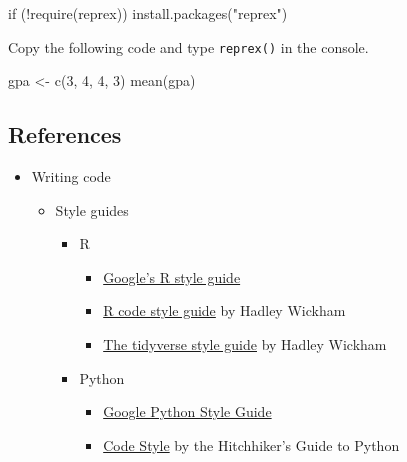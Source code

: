 \documentclass[
  letterpaper,
  DIV=11,
  numbers=noendperiod]{scrreprt}
\newenvironment{Shaded}{\begin{snugshade}}{\end{snugshade}}
\newcommand{\ControlFlowTok}[1]{\textcolor[rgb]{0.00,0.23,0.31}{#1}}
\newcommand{\DecValTok}[1]{\textcolor[rgb]{0.68,0.00,0.00}{#1}}
\newcommand{\FunctionTok}[1]{\textcolor[rgb]{0.28,0.35,0.67}{#1}}
\newcommand{\NormalTok}[1]{\textcolor[rgb]{0.00,0.23,0.31}{#1}}
\newcommand{\OtherTok}[1]{\textcolor[rgb]{0.00,0.23,0.31}{#1}}
\newcommand{\SpecialCharTok}[1]{\textcolor[rgb]{0.37,0.37,0.37}{#1}}
\newcommand{\StringTok}[1]{\textcolor[rgb]{0.13,0.47,0.30}{#1}}
\providecommand{\tightlist}{%
  \setlength{\itemsep}{0pt}\setlength{\parskip}{0pt}}\usepackage{longtable,booktabs,array}
\begin{document}
\begin{Shaded}
\begin{Highlighting}[]
\ControlFlowTok{if}\NormalTok{ (}\SpecialCharTok{!}\FunctionTok{require}\NormalTok{(reprex)) }\FunctionTok{install.packages}\NormalTok{(}\StringTok{"reprex"}\NormalTok{)}
\end{Highlighting}
\end{Shaded}

Copy the following code and type \texttt{reprex()} in the console.

\begin{Shaded}
\begin{Highlighting}[]
\NormalTok{gpa }\OtherTok{\textless{}{-}} \FunctionTok{c}\NormalTok{(}\DecValTok{3}\NormalTok{, }\DecValTok{4}\NormalTok{, }\DecValTok{4}\NormalTok{, }\DecValTok{3}\NormalTok{)}
\FunctionTok{mean}\NormalTok{(gpa)}
\end{Highlighting}
\end{Shaded}

\hypertarget{references-2}{%
\subsection*{References}\label{references-2}}

\begin{itemize}
\item
  Writing code

  \begin{itemize}
  \tightlist
  \item
    Style guides

    \begin{itemize}
    \tightlist
    \item
      R

      \begin{itemize}
      \tightlist
      \item
        \href{https://google.GitHub.io/styleguide/Rguide.xml}{Google's R
        style guide}
      \item
        \href{http://r-pkgs.had.co.nz/r.html}{R code style guide} by
        Hadley Wickham
      \item
        \href{http://style.tidyverse.org/}{The tidyverse style guide} by
        Hadley Wickham
      \end{itemize}
    \item
      Python

      \begin{itemize}
      \tightlist
      \item
        \href{https://GitHub.com/google/styleguide/blob/gh-pages/pyguide.md}{Google
        Python Style Guide}
      \item
        \href{https://docs.python-guide.org/writing/style/\#zen-of-python}{Code
        Style} by the Hitchhiker's Guide to Python
      \end{itemize}
    \end{itemize}
  \end{itemize}
\end{itemize}
\end{document}
